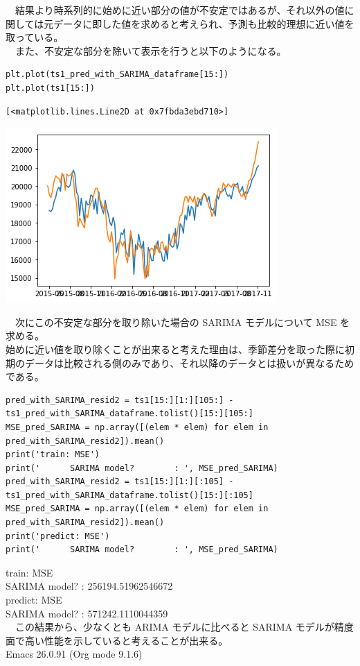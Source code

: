 \documentclass{scrartcl}
\begin{document}
　結果より時系列的に始めに近い部分の値が不安定ではあるが、それ以外の値に関しては元データに即した値を求めると考えられ、予測も比較的理想に近い値を取っている。\\
　また、不安定な部分を除いて表示を行うと以下のようになる。\\
\begin{verbatim}
plt.plot(ts1_pred_with_SARIMA_dataframe[15:])
plt.plot(ts1[15:])
\end{verbatim}

\begin{verbatim}
[<matplotlib.lines.Line2D at 0x7fbda3ebd710>]
\end{verbatim}
\begin{center}
\includegraphics[width=.9\linewidth]{./obipy-resources/fFVOJA.png}
\end{center}

　次にこの不安定な部分を取り除いた場合の SARIMA モデルについて MSE を求める。\\
始めに近い値を取り除くことが出来ると考えた理由は、季節差分を取った際に初期のデータは比較される側のみであり、それ以降のデータとは扱いが異なるためである。\\

\begin{verbatim}
pred_with_SARIMA_resid2 = ts1[15:][1:][105:] - ts1_pred_with_SARIMA_dataframe.tolist()[15:][105:]
MSE_pred_SARIMA = np.array([(elem * elem) for elem in pred_with_SARIMA_resid2]).mean()
print('train: MSE')
print('      SARIMA model?        : ', MSE_pred_SARIMA)
pred_with_SARIMA_resid2 = ts1[15:][1:][:105] - ts1_pred_with_SARIMA_dataframe.tolist()[15:][:105]
MSE_pred_SARIMA = np.array([(elem * elem) for elem in pred_with_SARIMA_resid2]).mean()
print('predict: MSE')
print('      SARIMA model?        : ', MSE_pred_SARIMA)
\end{verbatim}

train: MSE\\
      SARIMA model?        :  256194.51962546672\\
predict: MSE\\
      SARIMA model?        :  571242.1110044359\\

　この結果から、少なくとも ARIMA モデルに比べると SARIMA モデルが精度面で高い性能を示していると考えることが出来る。\\
\printbibliography
Emacs 26.0.91 (Org mode 9.1.6)
\end{document}
